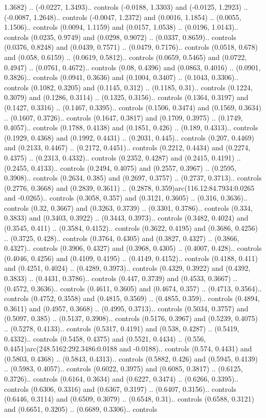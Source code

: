 1.3682) .. (-0.0227, 1.3493).. controls (-0.0188, 1.3303) and (-0.0125, 1.2923) .. (-0.0087, 1.2648).. controls (-0.0047, 1.2372) and (0.0016, 1.1854) .. (0.0055, 1.1506).. controls (0.0094, 1.1159) and (0.0157, 1.0538) .. (0.0196, 1.0143).. controls (0.0235, 0.9749) and (0.0298, 0.9072) .. (0.0337, 0.8659).. controls (0.0376, 0.8248) and (0.0439, 0.7571) .. (0.0479, 0.7176).. controls (0.0518, 0.678) and (0.058, 0.6159) .. (0.0619, 0.5812).. controls (0.0659, 0.5465) and (0.0722, 0.4947) .. (0.0761, 0.4672).. controls (0.08, 0.4396) and (0.0863, 0.4016) .. (0.0901, 0.3826).. controls (0.0941, 0.3636) and (0.1004, 0.3407) .. (0.1043, 0.3306).. controls (0.1082, 0.3205) and (0.1145, 0.312) .. (0.1185, 0.31).. controls (0.1224, 0.3079) and (0.1286, 0.3114) .. (0.1325, 0.3156).. controls (0.1364, 0.3197) and (0.1427, 0.3316) .. (0.1467, 0.3395).. controls (0.1506, 0.3474) and (0.1569, 0.3634) .. (0.1607, 0.3726).. controls (0.1647, 0.3817) and (0.1709, 0.3975) .. (0.1749, 0.4057).. controls (0.1788, 0.4138) and (0.1851, 0.426) .. (0.189, 0.4313).. controls (0.1929, 0.4368) and (0.1992, 0.4431) .. (0.2031, 0.445).. controls (0.207, 0.4469) and (0.2133, 0.4467) .. (0.2172, 0.4451).. controls (0.2212, 0.4434) and (0.2274, 0.4375) .. (0.2313, 0.4332).. controls (0.2352, 0.4287) and (0.2415, 0.4191) .. (0.2455, 0.4133).. controls (0.2494, 0.4075) and (0.2557, 0.3967) .. (0.2595, 0.3908).. controls (0.2634, 0.385) and (0.2697, 0.3757) .. (0.2737, 0.3713).. controls (0.2776, 0.3668) and (0.2839, 0.3611) .. (0.2878, 0.359)arc(116.12:84.7934:0.0265 and -0.0265).. controls (0.3058, 0.357) and (0.3121, 0.3605) .. (0.316, 0.3636).. controls (0.32, 0.3667) and (0.3263, 0.3739) .. (0.3301, 0.3786).. controls (0.334, 0.3833) and (0.3403, 0.3922) .. (0.3443, 0.3973).. controls (0.3482, 0.4024) and (0.3545, 0.411) .. (0.3584, 0.4152).. controls (0.3622, 0.4195) and (0.3686, 0.4256) .. (0.3725, 0.428).. controls (0.3764, 0.4305) and (0.3827, 0.4327) .. (0.3866, 0.4327).. controls (0.3906, 0.4327) and (0.3968, 0.4305) .. (0.4007, 0.428).. controls (0.4046, 0.4256) and (0.4109, 0.4195) .. (0.4149, 0.4152).. controls (0.4188, 0.411) and (0.4251, 0.4024) .. (0.4289, 0.3973).. controls (0.4329, 0.3922) and (0.4392, 0.3833) .. (0.4431, 0.3786).. controls (0.447, 0.3739) and (0.4533, 0.3667) .. (0.4572, 0.3636).. controls (0.4611, 0.3605) and (0.4674, 0.357) .. (0.4713, 0.3564).. controls (0.4752, 0.3558) and (0.4815, 0.3569) .. (0.4855, 0.359).. controls (0.4894, 0.3611) and (0.4957, 0.3668) .. (0.4995, 0.3713).. controls (0.5034, 0.3757) and (0.5097, 0.385) .. (0.5137, 0.3908).. controls (0.5176, 0.3967) and (0.5239, 0.4075) .. (0.5278, 0.4133).. controls (0.5317, 0.4191) and (0.538, 0.4287) .. (0.5419, 0.4332).. controls (0.5458, 0.4375) and (0.5521, 0.4434) .. (0.556, 0.4451)arc(248.5162:292.3486:0.0188 and -0.0188).. controls (0.574, 0.4431) and (0.5803, 0.4368) .. (0.5843, 0.4313).. controls (0.5882, 0.426) and (0.5945, 0.4139) .. (0.5983, 0.4057).. controls (0.6022, 0.3975) and (0.6085, 0.3817) .. (0.6125, 0.3726).. controls (0.6164, 0.3634) and (0.6227, 0.3474) .. (0.6266, 0.3395).. controls (0.6306, 0.3316) and (0.6367, 0.3197) .. (0.6407, 0.3156).. controls (0.6446, 0.3114) and (0.6509, 0.3079) .. (0.6548, 0.31).. controls (0.6588, 0.3121) and (0.6651, 0.3205) .. (0.6689, 0.3306).. controls 